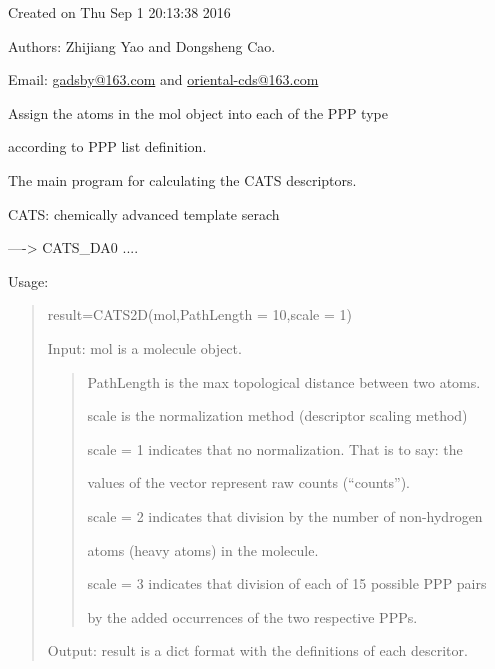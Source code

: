 \documentclass[letterpaper,10pt,english]{sphinxmanual}
\begin{document}
Created on Thu Sep  1 20:13:38 2016

Authors: Zhijiang Yao and Dongsheng Cao.

Email: \href{mailto:gadsby@163.com}{gadsby@163.com} and \href{mailto:oriental-cds@163.com}{oriental-cds@163.com}

\begin{fulllineitems}
\label{reference/cats2d:cats2d.AssignAtomType}
Assign the atoms in the mol object into each of the PPP type

according to PPP list definition.

\end{fulllineitems}


\begin{fulllineitems}
\label{reference/cats2d:cats2d.CATS2D}
The main program for calculating the CATS descriptors.

CATS: chemically advanced template serach

----\textgreater{} CATS\_DA0 ....

Usage:
\begin{quote}

result=CATS2D(mol,PathLength = 10,scale = 1)

Input: mol is a molecule object.
\begin{quote}

PathLength is the max topological distance between two atoms.

scale is the normalization method (descriptor scaling method)

scale = 1 indicates that no normalization. That is to say: the

values of the vector represent raw counts (``counts'').

scale = 2 indicates that division by the number of non-hydrogen

atoms (heavy atoms) in the molecule.

scale = 3 indicates that division of each of 15 possible PPP pairs

by the added occurrences of the two respective PPPs.
\end{quote}

Output: result is a dict format with the definitions of each descritor.
\end{quote}

\end{fulllineitems}
\end{document}
